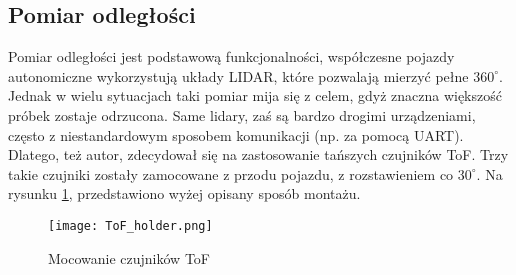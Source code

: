 
    \subsection{Pomiar odległości}
        Pomiar odległości jest podstawową funkcjonalności, współczesne pojazdy autonomiczne wykorzystują układy LIDAR, które pozwalają mierzyć pełne $360^\circ$.
        Jednak w wielu sytuacjach taki pomiar mija się z celem, gdyż znaczna większość próbek zostaje odrzucona.
        Same lidary, zaś są bardzo drogimi urządzeniami, często z niestandardowym sposobem komunikacji (np. za pomocą UART).
        Dlatego, też autor, zdecydował się na zastosowanie tańszych czujników ToF.
        Trzy takie czujniki zostały zamocowane z przodu pojazdu, z rozstawieniem co $30^\circ$.
        Na rysunku \ref{fig:ToF_holder}, przedstawiono wyżej opisany sposób montażu.
        \begin{figure}[!ht]
            \centering
            \texttt{[image: ToF\_holder.png]}
            \caption{Mocowanie czujników ToF}
            \label{fig:ToF_holder}
        \end{figure}
